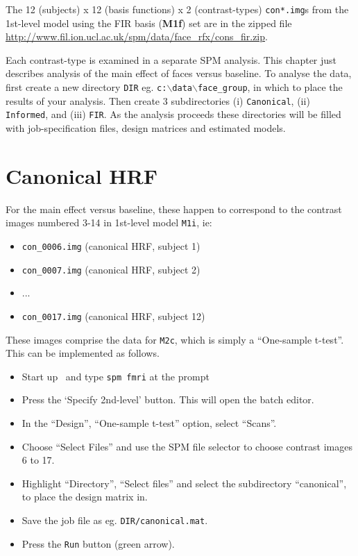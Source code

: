 The 12 (subjects) x 12 (basis functions) x 2 (contrast-types) \texttt{con*.img}s from the 1st-level model using the FIR basis (\textbf{M1f}) set are in the zipped file 
\newline \url{http://www.fil.ion.ucl.ac.uk/spm/data/face_rfx/cons_fir.zip}.

Each contrast-type is examined in a separate SPM analysis. This chapter just describes analysis of the main effect of faces versus baseline.
To analyse the data, first create a new directory \texttt{DIR} eg. \texttt{c:$\backslash$data$\backslash$face\_group}, in which to place the results of your analysis. Then create 3 subdirectories (i) \texttt{Canonical}, (ii) \texttt{Informed}, and (iii) \texttt{FIR}. 
As the analysis proceeds these directories will be filled with job-specification files, design matrices and estimated models.

\section{Canonical HRF}

For the main effect versus baseline, these happen to correspond to the contrast images numbered 3-14 in 1st-level model \texttt{M1i}, ie:

\begin{itemize}
\item \texttt{con\_0006.img}       (canonical HRF, subject 1)
\item \texttt{con\_0007.img}       (canonical HRF, subject 2)
\item ...
\item \texttt{con\_0017.img}       (canonical HRF, subject 12)
\end{itemize}
These images comprise the data for \texttt{M2c}, which is simply a ``One-sample t-test''. This can be implemented as follows.
\begin{itemize}
\item Start up \matlab\ and type \texttt{spm fmri} at the prompt
\item Press the `Specify 2nd-level' button. This will open the batch editor.
\item In the ``Design'', ``One-sample t-test'' option, select ``Scans''.
\item Choose ``Select Files'' and use the SPM file selector to choose contrast images 6 to 17.
\item Highlight ``Directory'', ``Select files'' and select the  subdirectory ``canonical'', to place the design matrix in.
\item Save the job file as eg. \texttt{DIR/canonical.mat}.
\item Press the \texttt{Run} button (green arrow).
\end{itemize}

